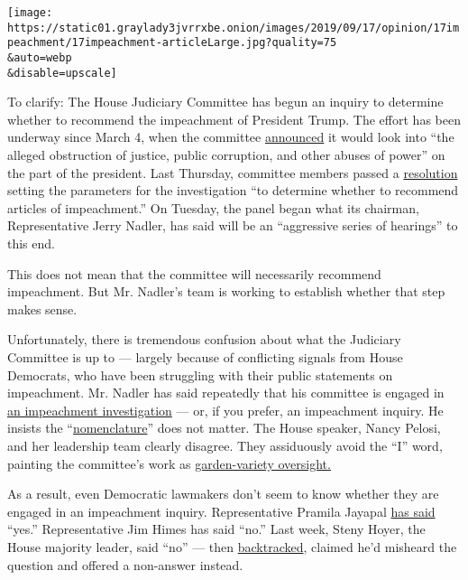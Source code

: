 \texttt{[image: https://static01.graylady3jvrrxbe.onion/images/2019/09/17/opinion/17impeachment/17impeachment-articleLarge.jpg?quality=75\\\&auto=webp\\\&disable=upscale]}

To clarify: The House Judiciary Committee has begun an inquiry to
determine whether to recommend the impeachment of President Trump. The
effort has been underway since March 4, when the committee
\href{https://judiciary.house.gov/news/press-releases/house-judiciary-committee-unveils-investigation-threats-against-rule-law}{announced}
it would look into ``the alleged obstruction of justice, public
corruption, and other abuses of power'' on the part of the president.
Last Thursday, committee members passed a
\href{https://bass.house.gov/sites/karenbass.house.gov/files/Resolution\%20for\%20Investigative\%20Procedures.pdf}{resolution}
setting the parameters for the investigation ``to determine whether to
recommend articles of impeachment.'' On Tuesday, the panel began what
its chairman, Representative Jerry Nadler, has said will be an
``aggressive series of hearings'' to this end.

This does not mean that the committee will necessarily recommend
impeachment. But Mr. Nadler's team is working to establish whether that
step makes sense.

Unfortunately, there is tremendous confusion about what the Judiciary
Committee is up to --- largely because of conflicting signals from House
Democrats, who have been struggling with their public statements on
impeachment. Mr. Nadler has said repeatedly that his committee is
engaged in
\href{https://www.nytimes3xbfgragh.onion/2019/09/13/us/politics/trump-impeachment-definition.html}{an
impeachment investigation} --- or, if you prefer, an impeachment
inquiry. He insists the
``\href{https://nadler.house.gov/news/documentsingle.aspx?DocumentID=394065}{nomenclature}''
does not matter. The House speaker, Nancy Pelosi, and her leadership
team clearly disagree. They assiduously avoid the ``I'' word, painting
the committee's work as
\href{https://www.nytimes3xbfgragh.onion/2019/04/22/us/politics/impeaching-trump-pelosi.html}{garden-variety
oversight.}

As a result, even Democratic lawmakers don't seem to know whether they
are engaged in an impeachment inquiry. Representative Pramila Jayapal
\href{https://www.politico.com/story/2019/09/10/impeachment-democrats-trump-1488401}{has
said} ``yes.'' Representative Jim Himes has said ``no.'' Last week,
Steny Hoyer, the House majority leader, said ``no'' --- then
\href{https://www.cnn.com/2019/09/12/politics/impeachment-investigation-vote-house-judiciary-committee/index.html}{backtracked},
claimed he'd misheard the question and offered a non-answer instead.


